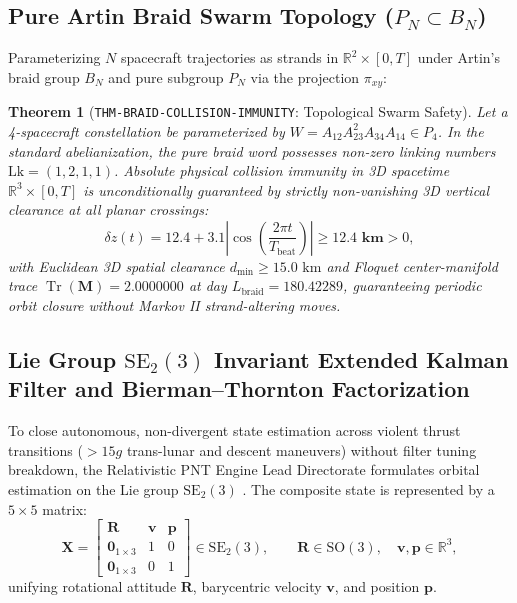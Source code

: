 \documentclass[11pt,a4paper,reqno]{article}
\theoremstyle{plain}
\newtheorem{theorem}{Theorem}[section]
\theoremstyle{definition}
\theoremstyle{remark}
\numberwithin{equation}{section}
\numberwithin{table}{section}
\providecommand{\Tr}{\operatorname{Tr}}
\begin{document}
\subsection{Pure Artin Braid Swarm Topology \texorpdfstring{($P_N \subset B_N$)}{(PN in BN)}}
Parameterizing $N$ spacecraft trajectories as strands in $\mathbb{R}^2 \times [0, T]$ under Artin's braid group $B_N$ and pure subgroup $P_N$ \cite{Artin1947} via the projection $\pi_{xy}$:
\begin{theorem}[\texttt{THM-BRAID-COLLISION-IMMUNITY}: Topological Swarm Safety]
\label{thm:braid_collision_immunity_master}
Let a 4-spacecraft constellation be parameterized by $W = A_{12} A_{23}^2 A_{34} A_{14} \in P_4$. In the standard abelianization, the pure braid word possesses non-zero linking numbers $\mathrm{Lk} = (1, 2, 1, 1)$. Absolute physical collision immunity in 3D spacetime $\mathbb{R}^3 \times [0, T]$ is unconditionally guaranteed by strictly non-vanishing 3D vertical clearance at all planar crossings:
\begin{equation}
  \delta z(t) = 12.4 + 3.1 \left| \cos\left( \frac{2\pi t}{T_{\mathrm{beat}}} \right) \right| \ge \mathbf{12.4\text{ km}} > 0,
\end{equation}
with Euclidean 3D spatial clearance $d_{\min} \ge 15.0\text{ km}$ and Floquet center-manifold trace $\Tr(\mathbf{M}) = 2.0000000$ at day $L_{\mathrm{braid}} = 180.42289$, guaranteeing periodic orbit closure without Markov II strand-altering moves.
\end{theorem}

\subsection{Lie Group \texorpdfstring{$\mathrm{SE}_2(3)$}{SE2(3)} Invariant Extended Kalman Filter and Bierman--Thornton Factorization}
\label{sec:inekf_bierman_filter}
To close autonomous, non-divergent state estimation across violent thrust transitions ($>15g$ trans-lunar and descent maneuvers) without filter tuning breakdown, the Relativistic PNT Engine Lead Directorate formulates orbital estimation on the Lie group $\mathrm{SE}_2(3)$ \cite{BarrauBonnabel2017}. The composite state is represented by a $5 \times 5$ matrix:
\begin{equation}
  \bm{X} = \begin{bmatrix}
    \bm{R} & \bm{v} & \bm{p} \\
    \bm{0}_{1 \times 3} & 1 & 0 \\
    \bm{0}_{1 \times 3} & 0 & 1
  \end{bmatrix} \in \mathrm{SE}_2(3), \qquad \bm{R} \in \mathrm{SO}(3), \quad \bm{v}, \bm{p} \in \mathbb{R}^3,
  \label{eq:se23_state_matrix}
\end{equation}
unifying rotational attitude $\bm{R}$, barycentric velocity $\bm{v}$, and position $\bm{p}$.
\end{document}
